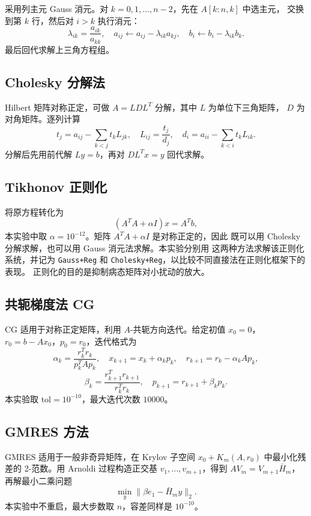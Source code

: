 \documentclass[UTF8]{ctexart}
\begin{document}
采用列主元 Gauss 消元。对 $k=0,1,\dots,n-2$，先在 $A[k:n,k]$ 中选主元，
交换到第 $k$ 行，然后对 $i>k$ 执行消元：
\[
\lambda_{ik}=\frac{a_{ik}}{a_{kk}},\quad
a_{ij}\leftarrow a_{ij}-\lambda_{ik}a_{kj},\quad
b_i\leftarrow b_i-\lambda_{ik}b_k.
\]
最后回代求解上三角方程组。

\subsection{Cholesky 分解法}

Hilbert 矩阵对称正定，可做 $A=LDL^T$ 分解，其中 $L$ 为单位下三角矩阵，
$D$ 为对角矩阵。逐列计算
\[
t_j = a_{ij}-\sum_{k<j}t_k L_{jk},\quad
L_{ij}=\frac{t_j}{d_j},\quad
d_i = a_{ii}-\sum_{k<i}t_k L_{ik}.
\]
分解后先用前代解 $Ly=b$，再对 $DL^Tx=y$ 回代求解。

\subsection{Tikhonov 正则化}

将原方程转化为
\[
(A^TA+\alpha I)x=A^Tb,
\]
本实验中取 $\alpha=10^{-12}$。矩阵 $A^TA+\alpha I$ 是对称正定的，因此
既可以用 Cholesky 分解求解，也可以用 Gauss 消元法求解。本实验分别用
这两种方法求解该正则化系统，并记为 \texttt{Gauss+Reg} 和
\texttt{Cholesky+Reg}，以比较不同直接法在正则化框架下的表现。
正则化的目的是抑制病态矩阵对小扰动的放大。

\subsection{共轭梯度法 CG}

CG 适用于对称正定矩阵，利用 $A$-共轭方向迭代。给定初值 $x_0=0$，
$r_0=b-Ax_0$，$p_0=r_0$，迭代格式为
\[
\alpha_k=\frac{r_k^Tr_k}{p_k^TAp_k},\quad
x_{k+1}=x_k+\alpha_k p_k,\quad
r_{k+1}=r_k-\alpha_k Ap_k,
\]
\[
\beta_k=\frac{r_{k+1}^Tr_{k+1}}{r_k^Tr_k},\quad
p_{k+1}=r_{k+1}+\beta_k p_k.
\]
本实验取 $\text{tol}=10^{-10}$，最大迭代次数 $10000$。

\subsection{GMRES 方法}

GMRES 适用于一般非奇异矩阵，在 Krylov 子空间
$x_0+K_m(A,r_0)$ 中最小化残差的 2-范数。用 Arnoldi 过程构造正交基
$v_1,\dots,v_{m+1}$，得到 $AV_m=V_{m+1}\bar H_m$，再解最小二乘问题
\[
\min_{y}\|\beta e_1-\bar H_m y\|_2.
\]
本实验中不重启，最大步数取 $n$，容差同样是 $10^{-10}$。
\end{document}
